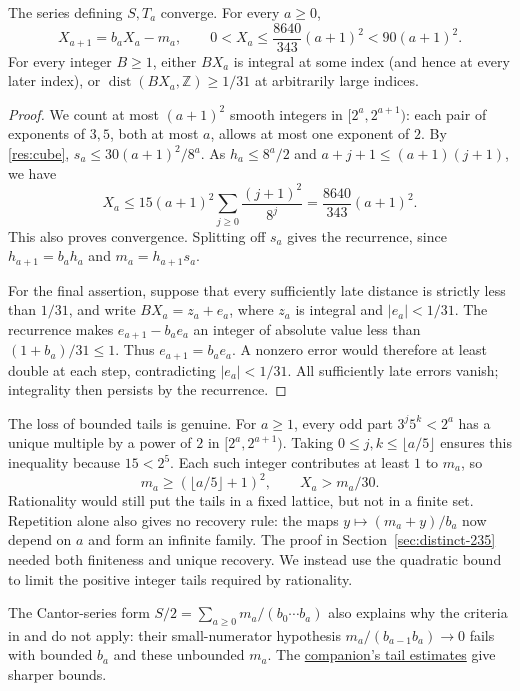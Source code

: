 \documentclass[11pt]{article}
\newcommand{\longrecord}[2]{\href{erdos269-running-lcm-reasoning-surface.pdf\##1}{#2}}
\begin{document}
\begin{proposition}
\label{res:actual-orbit}
The series defining $S,T_a$ converge.  For every $a\ge0$,
\[
 X_{a+1}=b_aX_a-m_a,\qquad
 0<X_a\le\frac{8640}{343}(a+1)^2<90(a+1)^2.
\]
For every integer $B\ge1$, either $BX_a$ is integral at some index (and hence at every later index), or $\operatorname{dist}(BX_a,\mathbb Z)\ge1/31$
at arbitrarily large indices.
\end{proposition}
\begin{proof}
We count at most $(a+1)^2$ smooth integers in $[2^a,2^{a+1})$: each pair
of exponents of $3,5$, both at most $a$, allows at most one exponent of $2$.
By \eqref{res:cube},
$s_a\le30(a+1)^2/8^a$. As $h_a\le8^a/2$ and
$a+j+1\le(a+1)(j+1)$, we have
\[
 X_a\le15(a+1)^2\sum_{j\ge0}\frac{(j+1)^2}{8^j}
     =\frac{8640}{343}(a+1)^2.
\]
This also proves convergence. Splitting off $s_a$ gives the recurrence,
since $h_{a+1}=b_ah_a$ and $m_a=h_{a+1}s_a$.

For the final assertion, suppose that every sufficiently late distance
is strictly less than $1/31$, and write $BX_a=z_a+e_a$, where $z_a$ is
integral and $|e_a|<1/31$. The recurrence makes $e_{a+1}-b_ae_a$ an
integer of absolute value less than $(1+b_a)/31\le1$. Thus
$e_{a+1}=b_ae_a$. A nonzero error would therefore at least double at
each step, contradicting $|e_a|<1/31$. All sufficiently late errors vanish;
integrality then persists by the recurrence.
\end{proof}

The loss of bounded tails is genuine. For $a\ge1$, every odd part
$3^j5^k<2^a$ has a unique multiple by a power of $2$ in
$[2^a,2^{a+1})$. Taking $0\le j,k\le\lfloor a/5\rfloor$ ensures this
inequality because $15<2^5$. Each such integer contributes at least $1$
to $m_a$, so
\[
 m_a\ge(\lfloor a/5\rfloor+1)^2,\qquad X_a>m_a/30.
\]
Rationality would still put the tails in a fixed lattice, but not in a
finite set. Repetition alone also gives no recovery rule: the maps
$y\mapsto(m_a+y)/b_a$ now depend on $a$ and form an infinite family.
The proof in Section~\ref{sec:distinct-235} needed both finiteness and
unique recovery. We instead use the quadratic bound to limit the positive
integer tails required by rationality.

The Cantor-series form $S/2=\sum_{a\ge0}m_a/(b_0\cdots b_a)$ also
explains why the criteria in \cite[Theorem~2.1]{erdosstraus1974} and
\cite[Theorem~3.1]{hancltijdeman2004} do not apply: their small-numerator
hypothesis $m_a/(b_{a-1}b_a)\to0$ fails with bounded $b_a$ and these
unbounded $m_a$. The \longrecord{r3-repeated-bounds}{companion's tail estimates}
give sharper bounds.
\end{document}

